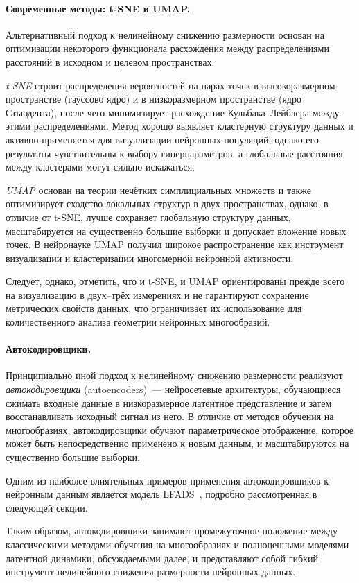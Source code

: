 \paragraph{Современные методы: t-SNE и UMAP.}
Альтернативный подход к нелинейному снижению размерности основан на оптимизации некоторого функционала расхождения между распределениями расстояний в исходном и целевом пространствах.

\textit{t-SNE} \cite{vandermaaten08a} строит распределения вероятностей на парах точек в высокоразмерном пространстве (гауссово ядро) и в низкоразмерном пространстве (ядро Стьюдента), после чего минимизирует расхождение Кульбака--Лейблера между этими распределениями.
Метод хорошо выявляет кластерную структуру данных и активно применяется для визуализации нейронных популяций, однако его результаты чувствительны к выбору гиперпараметров, а глобальные расстояния между кластерами могут сильно искажаться.

\textit{UMAP} \cite{McInnes2018} основан на теории нечётких симплициальных множеств и также оптимизирует сходство локальных структур в двух пространствах, однако, в отличие от t-SNE, лучше сохраняет глобальную структуру данных, масштабируется на существенно большие выборки и допускает вложение новых точек.
В нейронауке UMAP получил широкое распространение как инструмент визуализации и кластеризации многомерной нейронной активности.

Следует, однако, отметить, что и t-SNE, и UMAP ориентированы прежде всего на визуализацию в двух--трёх измерениях и не гарантируют сохранение метрических свойств данных, что ограничивает их использование для количественного анализа геометрии нейронных многообразий.

\paragraph{Автокодировщики.}
Принципиально иной подход к нелинейному снижению размерности реализуют \textit{автокодировщики} (autoencoders)~--- нейросетевые архитектуры, обучающиеся сжимать входные данные в низкоразмерное латентное представление и затем восстанавливать исходный сигнал из него.
В отличие от методов обучения на многообразиях, автокодировщики обучают параметрическое отображение, которое может быть непосредственно применено к новым данным, и масштабируются на существенно большие выборки.

Одним из наиболее влиятельных примеров применения автокодировщиков к нейронным данным является модель LFADS~\cite{Pandarinath2018}, подробно рассмотренная в следующей секции.

Таким образом, автокодировщики занимают промежуточное положение между классическими методами обучения на многообразиях и полноценными моделями латентной динамики, обсуждаемыми далее, и представляют собой гибкий инструмент нелинейного снижения размерности нейронных данных.
